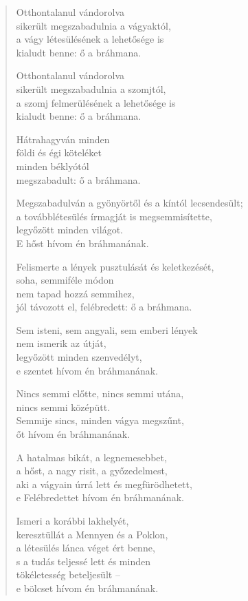 \begin{verse}
 Otthontalanul vándorolva\\
sikerült megszabadulnia a vágyaktól,\\
a vágy létesülésének a lehetősége is\\
kialudt benne: ő a bráhmana.

 Otthontalanul vándorolva\\
sikerült megszabadulnia a szomjtól,\\
a szomj felmerülésének a lehetősége is\\
kialudt benne: ő a bráhmana.

 Hátrahagyván minden\\
földi és égi köteléket\\
minden béklyótól\\
megszabadult: ő a bráhmana.

 Megszabadulván a gyönyörtől és a kíntól lecsendesült;\\
a továbblétesülés írmagját is megsemmisítette,\\
legyőzött minden világot.\\
E hőst hívom én bráhmanának.

 Felismerte a lények pusztulását és keletkezését,\\
soha, semmiféle módon\\
nem tapad hozzá semmihez,\\
jól távozott el, felébredett: ő a bráhmana.

 Sem isteni, sem angyali, sem emberi lények\\
nem ismerik az útját,\\
legyőzött minden szenvedélyt,\\
e szentet hívom én bráhmanának.

 Nincs semmi előtte, nincs semmi utána,\\
nincs semmi középütt.\\
Semmije sincs, minden vágya megszűnt,\\
őt hívom én bráhmanának.

 A hatalmas bikát, a legnemesebbet,\\
a hőst, a nagy risit, a győzedelmest,\\
aki a vágyain úrrá lett és megfürödhetett,\\
e Felébredettet hívom én bráhmanának.

 Ismeri a korábbi lakhelyét,\\
keresztüllát a Mennyen és a Poklon,\\
a létesülés lánca véget ért benne,\\
s a tudás teljessé lett és minden\\
tökéletesség beteljesült –\\
e bölcset hívom én bráhmanának.

\end{verse}
